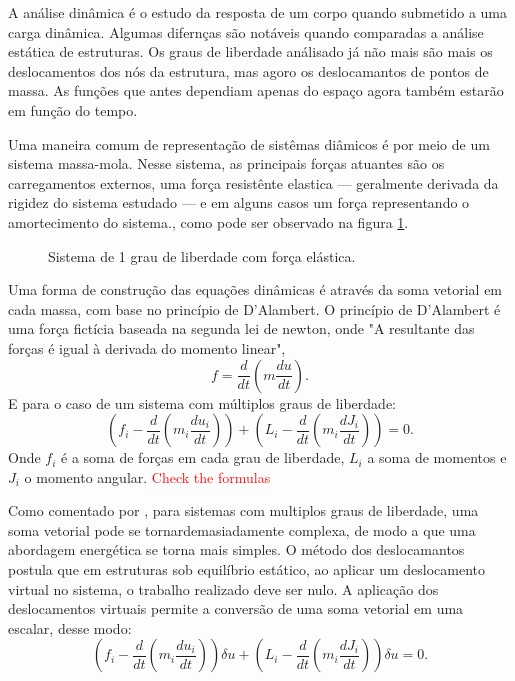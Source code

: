 \documentclass[12pt, a4paper]{article}
\begin{document}
\indent A análise dinâmica é o estudo da resposta de um corpo quando submetido a uma carga dinâmica. Algumas difernças são notáveis quando 
comparadas a análise estática de estruturas. Os graus de liberdade análisado já não mais são mais os  deslocamentos dos 
nós da estrutura, mas agoro os deslocamantos de pontos de massa. As funções que antes dependiam apenas do espaço agora também 
estarão em função do tempo.

\indent Uma maneira comum de representação de sistêmas diâmicos é por meio de um sistema massa-mola. Nesse sistema, as principais forças 
atuantes são os carregamentos externos, uma força resistênte elastica — geralmente derivada da rigidez do sistema estudado — e em 
alguns casos um força representando o amortecimento do sistema., como pode ser observado na figura \ref{fig:1}.
\vspace{5mm}
\begin{figure}[h]
    \centering
    \caption{Sistema de 1 grau de liberdade com força elástica.}
    \label{fig:1}
\end{figure}
\vspace{5mm}

\indent Uma forma de construção das equações dinâmicas é através da soma vetorial em cada massa, com base no princípio de D'Alambert. 
O princípio de D'Alambert é uma força fictícia baseada na segunda lei de newton, onde "A resultante das forças é igual à derivada do 
momento linear", 
\vspace{5mm}
\begin{equation}
    f = \frac{d}{dt}\left( m\frac{du}{dt} \right).
    \label{eq.1}
\end{equation}
\vspace{5mm}
E para o caso de um sistema com múltiplos graus de liberdade:
\vspace{5mm}
\begin{equation}
    \left( f_i - \frac{d}{dt}\left( m_i\frac{du_i}{dt} \right) \right) + \left( L_i - \frac{d}{dt}\left( m_i\frac{dJ_i}{dt} \right) \right) = 0.
    \label{eq.2}
\end{equation}
\vspace{5mm}
Onde $f_i$ é a soma de forças em cada grau de liberdade, $L_i$ a soma de momentos e $J_i$ o momento angular. \textcolor{red}{Check the formulas}

\indent Como comentado por \cite{}, para sistemas com multiplos graus de liberdade, 
uma soma vetorial pode se tornardemasiadamente complexa, de modo a que uma abordagem energética se torna mais simples. O método dos 
deslocamantos postula que em estruturas sob equilíbrio estático, ao aplicar um deslocamento virtual no sistema, o trabalho realizado deve 
ser nulo. A aplicação dos deslocamentos virtuais permite a conversão de uma soma vetorial em uma escalar, desse modo:
\vspace{5mm}
\begin{equation}
    \left( f_i - \frac{d}{dt}\left( m_i\frac{du_i}{dt} \right) \right)\delta u + \left( L_i - \frac{d}{dt}\left( m_i\frac{dJ_i}{dt} \right) 
    \right) \delta u  = 0.
\end{equation}
\vspace{5mm}
\end{document}
